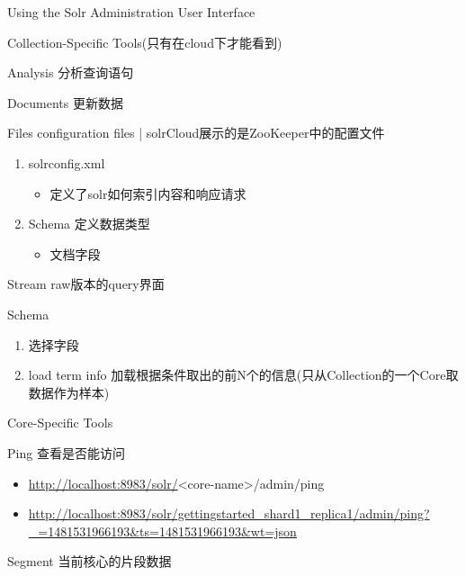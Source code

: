 \documentclass[presentation]{beamer}
\begin{document}
\begin{frame}[label={sec:org5755c49}]{Using the Solr Administration User Interface}
\begin{block}{Collection-Specific Tools(只有在cloud下才能看到)}
\begin{block}{Analysis}
分析查询语句
\end{block}

\begin{block}{Documents}
更新数据
\end{block}

\begin{block}{Files}
configuration files | solrCloud展示的是ZooKeeper中的配置文件
\begin{enumerate}
\item solrconfig.xml
\begin{itemize}
\item 定义了solr如何索引内容和响应请求
\end{itemize}
\item Schema 定义数据类型
\begin{itemize}
\item 文档字段
\end{itemize}
\end{enumerate}
\end{block}


\begin{block}{Stream}
raw版本的query界面
\end{block}


\begin{block}{Schema}
\begin{enumerate}
\item 选择字段
\item load term info 加载根据条件取出的前N个的信息(只从Collection的一个Core取数据作为样本)
\end{enumerate}
\end{block}
\end{block}


\begin{block}{Core-Specific Tools}
\begin{block}{Ping}
查看是否能访问
\begin{itemize}
\item \url{http://localhost:8983/solr/}<core-name>/admin/ping
\item \url{http://localhost:8983/solr/gettingstarted\_shard1\_replica1/admin/ping?\_=1481531966193\&ts=1481531966193\&wt=json}
\end{itemize}
\end{block}


\begin{block}{Segment}
当前核心的片段数据
\end{block}
\end{block}
\end{frame}
\end{document}
